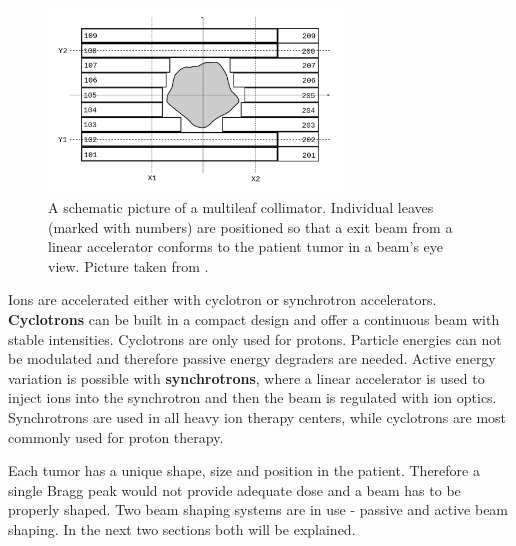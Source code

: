 \documentclass[type=dr, dr=rernat, accentcolor=tud7b,colorbacktitle, bigchapter, openright, twoside, 12pt ]{tudthesis}
\begin{document}
\newpage

\begin{figure}[H]
\begin{center}
\includegraphics[width=0.7\textwidth]{./Images/MLC.png}
\caption{A schematic picture of a multileaf collimator. Individual leaves (marked with numbers) are positioned so that a exit beam from a linear accelerator conforms to the patient tumor in a beam's eye view. Picture taken from \cite{MLC}.}
\label{MLC}
\end{center}
\end{figure}





Ions are accelerated either with cyclotron or synchrotron accelerators. \textbf{Cyclotrons} can be built in a compact design and offer a continuous beam with
stable intensities. Cyclotrons are only used for protons. Particle energies can not be modulated and therefore passive energy degraders are needed. Active energy variation is possible with \textbf{synchrotrons}, where a linear
accelerator is used to inject ions into the synchrotron and then the beam is regulated with ion optics. Synchrotrons are used in all heavy ion therapy centers, while cyclotrons are most
commonly used for proton therapy.

Each tumor has a unique shape, size and position in the patient. Therefore a single Bragg peak would not provide adequate dose and a beam has to be properly shaped. Two beam shaping systems
are in use - passive and active beam shaping. In the next two sections both will be explained.
\end{document}
